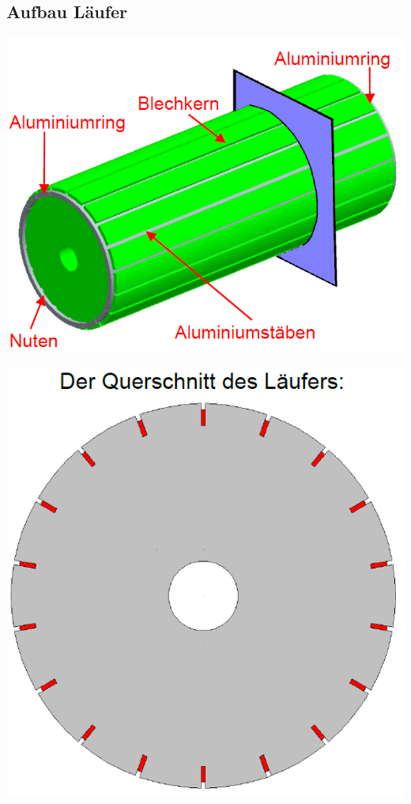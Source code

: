     \subsection{Aufbau Läufer}
    \begin{multicols}{3}
        \begin{minipage}{\linewidth}
        	\includegraphics[width=\linewidth]{images/AsynchronRotor}
        \end{minipage}   
             
        \begin{minipage}{\linewidth}
        	\includegraphics[width=0.7\linewidth]{images/QuerschnittAsynchronrotor}
        \end{minipage}  
              

\end{multicols}
